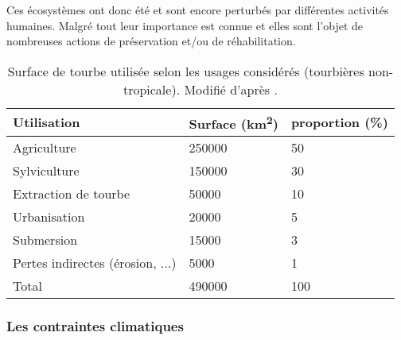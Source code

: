 Ces écosystèmes ont donc été et sont encore perturbés par différentes activités humaines.
Malgré tout leur importance est connue et elles sont l'objet de nombreuses actions de préservation et/ou de réhabilitation.
\begin{table}[]
\centering
\caption{Surface de tourbe utilisée selon les usages considérés (tourbières non-tropicale). Modifié d'après \citet{joosten2002}.}
\label{table:tourbeUsage}
\begin{tabular}{lll}\toprule
Utilisation & Surface (\si{\square\kilo\meter})  & proportion (\%) \\ \midrule
Agriculture & \num{250000} & \num{50} \\ 
Sylviculture & \num{150000} & \num{30}\\ 
Extraction de tourbe & \num{50000} & \num{10}\\ 
Urbanisation & \num{20000} & \num{5}\\ 
Submersion & \num{15000} & \num{3}\\ 
Pertes indirectes (érosion, ...) & \num{5000} & \num{1}\\[1ex]
Total & \num{490000} & \num{100}\\
\bottomrule
\end{tabular}
\end{table}


\subsubsection{Les contraintes climatiques}

